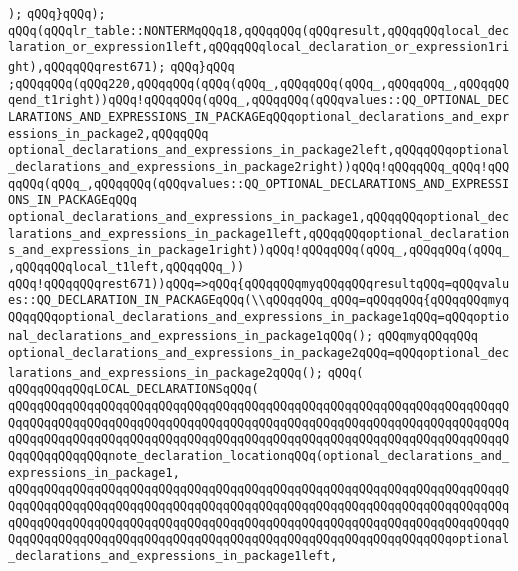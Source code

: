 \verb|);|\newline
\verb|qQQq}qQQq);|\newline
\verb|qQQq(qQQqlr_table::NONTERMqQQq18,qQQqqQQq(qQQqresult,qQQqqQQqlocal_declaration_or_expression1left,qQQqqQQqlocal_declaration_or_expression1right),qQQqqQQqrest671);|\newline
\verb|qQQq}qQQq|\newline
\verb|;qQQqqQQq(qQQq220,qQQqqQQq(qQQq(qQQq_,qQQqqQQq(qQQq_,qQQqqQQq_,qQQqqQQqend_t1right))qQQq!qQQqqQQq(qQQq_,qQQqqQQq(qQQqvalues::QQ_OPTIONAL_DECLARATIONS_AND_EXPRESSIONS_IN_PACKAGEqQQqoptional_declarations_and_expressions_in_package2,qQQqqQQq|\newline
\verb|optional_declarations_and_expressions_in_package2left,qQQqqQQqoptional_declarations_and_expressions_in_package2right))qQQq!qQQqqQQq_qQQq!qQQqqQQq(qQQq_,qQQqqQQq(qQQqvalues::QQ_OPTIONAL_DECLARATIONS_AND_EXPRESSIONS_IN_PACKAGEqQQq|\newline
\verb|optional_declarations_and_expressions_in_package1,qQQqqQQqoptional_declarations_and_expressions_in_package1left,qQQqqQQqoptional_declarations_and_expressions_in_package1right))qQQq!qQQqqQQq(qQQq_,qQQqqQQq(qQQq_,qQQqqQQqlocal_t1left,qQQqqQQq_))|\newline
\verb|qQQq!qQQqqQQqrest671))qQQq=>qQQq{qQQqqQQqmyqQQqqQQqresultqQQq=qQQqvalues::QQ_DECLARATION_IN_PACKAGEqQQq(\\qQQqqQQq_qQQq=qQQqqQQq{qQQqqQQqmyqQQqqQQqoptional_declarations_and_expressions_in_package1qQQq=qQQqoptional_declarations_and_expressions_in_package1qQQq();|\newline
\verb|qQQqmyqQQqqQQq|\newline
\verb|optional_declarations_and_expressions_in_package2qQQq=qQQqoptional_declarations_and_expressions_in_package2qQQq();|\newline
\verb|qQQq(|\newline
\verb|qQQqqQQqqQQqLOCAL_DECLARATIONSqQQq(|\newline
\verb|qQQqqQQqqQQqqQQqqQQqqQQqqQQqqQQqqQQqqQQqqQQqqQQqqQQqqQQqqQQqqQQqqQQqqQQqqQQqqQQqqQQqqQQqqQQqqQQqqQQqqQQqqQQqqQQqqQQqqQQqqQQqqQQqqQQqqQQqqQQqqQQqqQQqqQQqqQQqqQQqqQQqqQQqqQQqqQQqqQQqqQQqqQQqqQQqqQQqqQQqqQQqqQQqqQQqqQQqqQQqqQQqnote_declaration_locationqQQq(optional_declarations_and_expressions_in_package1,|\newline
\verb|qQQqqQQqqQQqqQQqqQQqqQQqqQQqqQQqqQQqqQQqqQQqqQQqqQQqqQQqqQQqqQQqqQQqqQQqqQQqqQQqqQQqqQQqqQQqqQQqqQQqqQQqqQQqqQQqqQQqqQQqqQQqqQQqqQQqqQQqqQQqqQQqqQQqqQQqqQQqqQQqqQQqqQQqqQQqqQQqqQQqqQQqqQQqqQQqqQQqqQQqqQQqqQQqqQQqqQQqqQQqqQQqqQQqqQQqqQQqqQQqqQQqqQQqqQQqqQQqqQQqqQQqqQQqqQQqoptional_declarations_and_expressions_in_package1left,|\newline
